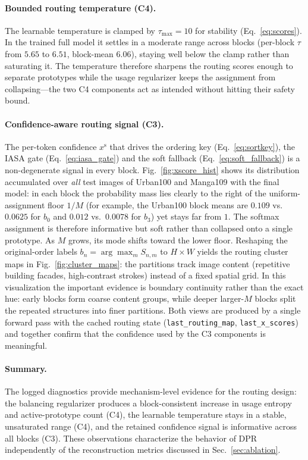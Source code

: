 \paragraph{Bounded routing temperature (C4).}
The learnable temperature is clamped by $\tau_{\max}{=}10$ for stability
(Eq.~\eqref{eq:scores}). In the trained full model it settles in a moderate range
across blocks (per-block $\tau$ from $5.65$ to $6.51$, block-mean $6.06$), staying
well below the clamp rather than saturating it. The temperature therefore sharpens
the routing scores enough to separate prototypes while the usage regularizer keeps
the assignment from collapsing---the two C4 components act as intended without
hitting their safety bound.

\paragraph{Confidence-aware routing signal (C3).}
The per-token confidence $x^{\mathrm{s}}$ that drives the ordering key
(Eq.~\eqref{eq:sortkey}), the IASA gate (Eq.~\eqref{eq:iasa_gate}) and the soft
fallback (Eq.~\eqref{eq:soft_fallback}) is a non-degenerate signal in every block.
Fig.~\ref{fig:xscore_hist} shows its distribution accumulated over \emph{all} test
images of Urban100 and Manga109 with the final model: in each block the probability
mass lies clearly to the right of the uniform-assignment floor $1/M$ (for example, the
Urban100 block means are $0.109$ vs.\ $0.0625$ for $b_0$ and $0.012$ vs.\
$0.0078$ for $b_3$) yet stays far from $1$. The
softmax assignment is therefore informative but soft rather than collapsed onto a
single prototype. As $M$ grows, its mode shifts toward the lower floor. Reshaping
the original-order labels $b_n=\arg\max_m S_{n,m}$ to $H\times W$ yields the routing
cluster maps in Fig.~\ref{fig:cluster_maps}: the partitions track image content
(repetitive building facades, high-contrast strokes) instead of a fixed spatial
grid. In this visualization the important evidence is boundary continuity rather
than the exact hue: early blocks form coarse content groups, while deeper
larger-$M$ blocks split the repeated structures into finer partitions. Both views
are produced by a single forward pass with the cached routing state
(\texttt{last\_routing\_map}, \texttt{last\_x\_scores}) and together confirm that
the confidence used by the C3 components is meaningful.

\paragraph{Summary.}
The logged diagnostics provide mechanism-level evidence for the routing design:
the balancing regularizer produces a block-consistent increase in usage
entropy and active-prototype count (C4), the learnable temperature stays in a
stable, unsaturated range (C4), and the retained confidence signal is informative
across all blocks (C3). These observations characterize the behavior of DPR
independently of the reconstruction metrics discussed in
Sec.~\ref{sec:ablation}.
